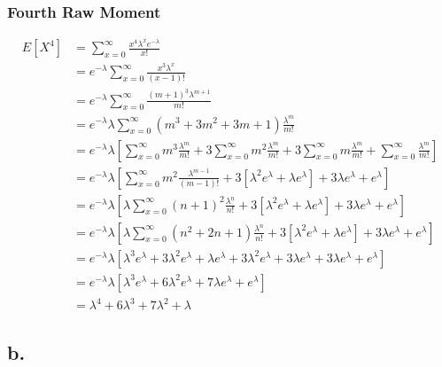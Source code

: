 \documentclass[12pt]{article}
\begin{document}
\subsubsection*{Fourth Raw Moment}
\begin{align*}
  E[X^4] &= \sum_{x=0}^\infty \frac{x^4\lambda^x e^{-\lambda}}{x!} \\
  &= e^{-\lambda} \sum_{x=0}^{\infty} \frac{x^3\lambda^x}{(x-1)!} \\
  &= e^{-\lambda} \sum_{x=0}^{\infty} \frac{(m+1)^3\lambda^{m+1}}{m!} \\
  &= e^{-\lambda}\lambda \sum_{x=0}^{\infty} (m^3+3m^2+3m+1)\frac{\lambda^m}{m!} \\
  &= e^{-\lambda}\lambda \left[\sum_{x=0}^{\infty} m^3\frac{\lambda^m}{m!}
    + 3\sum_{x=0}^{\infty} m^2\frac{\lambda^m}{m!}
    + 3\sum_{x=0}^{\infty} m\frac{\lambda^m}{m!}
    + \sum_{x=0}^{\infty} \frac{\lambda^m}{m!}\right] \\
  &= e^{-\lambda}\lambda \left[\sum_{x=0}^{\infty} m^2 \frac{\lambda^{m-1}}{(m-1)!}
    + 3[\lambda^2e^{\lambda}+\lambda e^{\lambda}]
    + 3\lambda e^{\lambda}
    + e^{\lambda}\right] \\
  &= e^{-\lambda}\lambda \left[\lambda\sum_{x=0}^{\infty} (n+1)^2 \frac{\lambda^{n}}{n!}
    + 3[\lambda^2e^{\lambda}+\lambda e^{\lambda}]
    + 3\lambda e^{\lambda}
    + e^{\lambda}\right] \\
  &= e^{-\lambda}\lambda \left[\lambda\sum_{x=0}^{\infty} (n^2+2n+1) \frac{\lambda^{n}}{n!}
    + 3[\lambda^2e^{\lambda}+\lambda e^{\lambda}]
    + 3\lambda e^{\lambda}
    + e^{\lambda}\right] \\
  &= e^{-\lambda}\lambda \left[\lambda^3 e^{\lambda} + 3\lambda^2 e^{\lambda} + \lambda e^{\lambda}
    + 3\lambda^2e^{\lambda}+ 3\lambda e^{\lambda}
    + 3\lambda e^{\lambda}
    + e^{\lambda}\right] \\   
  &= e^{-\lambda}\lambda \left[\lambda^3 e^{\lambda} + 6\lambda^2 e^{\lambda} 
    + 7\lambda e^{\lambda} + e^{\lambda} \right] \\
  &= \lambda^4 + 6\lambda^3 + 7\lambda^2 + \lambda
\end{align*}


\subsection*{b.}
\end{document}

